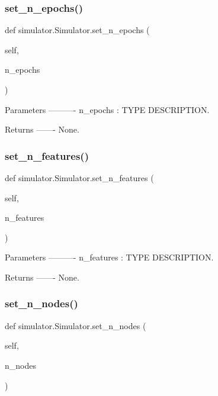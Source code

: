 \subsubsection{\texorpdfstring{set\+\_\+n\+\_\+epochs()}{set\_n\_epochs()}}
{\footnotesize\ttfamily def simulator.\+Simulator.\+set\+\_\+n\+\_\+epochs (\begin{DoxyParamCaption}\item[{}]{self,  }\item[{}]{n\+\_\+epochs }\end{DoxyParamCaption})}

\begin{DoxyVerb}Parameters
----------
n_epochs : TYPE
    DESCRIPTION.

Returns
-------
None.\end{DoxyVerb}
 \mbox{\label{classsimulator_1_1Simulator_ae2a1a2f8db9633c2aed2dd4d62b77612}} 
\subsubsection{\texorpdfstring{set\+\_\+n\+\_\+features()}{set\_n\_features()}}
{\footnotesize\ttfamily def simulator.\+Simulator.\+set\+\_\+n\+\_\+features (\begin{DoxyParamCaption}\item[{}]{self,  }\item[{}]{n\+\_\+features }\end{DoxyParamCaption})}

\begin{DoxyVerb}Parameters
----------
n_features : TYPE
    DESCRIPTION.

Returns
-------
None.\end{DoxyVerb}
 \mbox{\label{classsimulator_1_1Simulator_a324de43e915761d93a5aa08f7c013a22}} 
\subsubsection{\texorpdfstring{set\+\_\+n\+\_\+nodes()}{set\_n\_nodes()}}
{\footnotesize\ttfamily def simulator.\+Simulator.\+set\+\_\+n\+\_\+nodes (\begin{DoxyParamCaption}\item[{}]{self,  }\item[{}]{n\+\_\+nodes }\end{DoxyParamCaption})}

